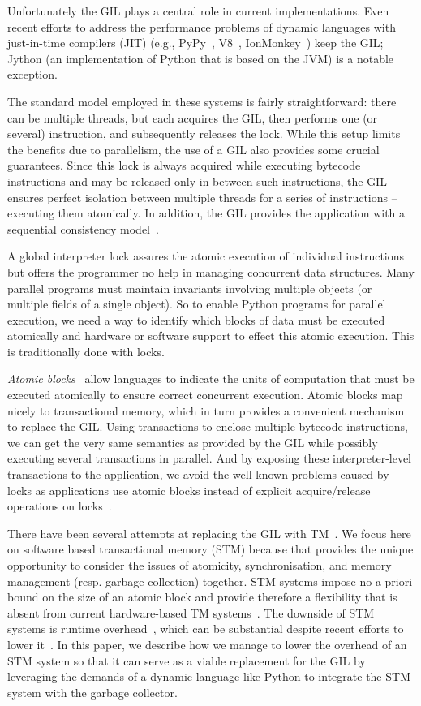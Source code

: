 \documentclass{sigplanconf}
\begin{document}
Unfortunately the GIL plays a central role in current
implementations. Even recent efforts to address the performance problems
of dynamic languages with just-in-time compilers (JIT)
(e.g., PyPy~\cite{cfbolz09}, V8~\cite{kevin10},
IonMonkey~\cite{ionmonkey}) keep the GIL; Jython (an
implementation of Python that is based on the JVM) is a notable
exception.

The standard model employed in these systems is fairly
straightforward: there can be multiple threads, but each acquires the
GIL, then performs one (or several) instruction, and subsequently releases the
lock.  While this setup limits the benefits due to parallelism,
the use of a GIL also provides
some crucial guarantees. Since this lock is always acquired while
executing bytecode instructions and may be released only in-between
such instructions, the GIL ensures perfect isolation between multiple
threads for a series of instructions -- executing them atomically.
In addition, the GIL provides the application with a sequential
consistency model~\cite{lamport79}.

A global interpreter lock assures the atomic execution of individual
instructions but offers the programmer no help in managing concurrent
data structures. Many parallel programs must maintain invariants
involving multiple objects (or multiple fields of a single
object).  So to enable Python programs for parallel execution, we need
a way to identify which blocks of data must be executed atomically and
hardware or software support to effect this atomic execution.
This is traditionally done with locks.

\emph{Atomic blocks}~\cite{tim03,tim05} allow languages to
indicate the units of computation that must be executed atomically to
ensure correct concurrent execution.  Atomic blocks map nicely to
transactional memory, which in turn provides a convenient mechanism to replace
the GIL.  Using transactions to enclose multiple bytecode
instructions, we can get the very same semantics as provided by the
GIL while possibly executing several transactions in parallel. And by
exposing these interpreter-level transactions to the application, we
avoid the well-known problems caused by locks as applications use
atomic blocks instead of explicit acquire/release operations on
locks~\cite{christopher10,victor11,shan08}.

There have been several attempts at replacing the GIL with
TM~\cite{nicholas06,odaira14,fuad10}.  We focus here on software based
transactional memory (STM) because that provides the unique
opportunity to consider the issues of atomicity, synchronisation, and
memory management (resp. garbage collection) together.  STM systems
impose no a-priori bound on the size of an atomic block and provide
therefore a flexibility that is absent from current hardware-based TM
systems~\cite{wayforward14}.  The downside of STM systems is runtime
overhead~\cite{cascaval08,drago11}, which can be substantial despite
recent efforts to lower it~\cite{warmhoff13,spear09}.  In
this paper, we describe how we manage to lower the overhead of an STM
system so that it can serve as a viable replacement for the GIL by
leveraging the demands of a dynamic language like Python to integrate
the STM system with the garbage collector.
\end{document}
